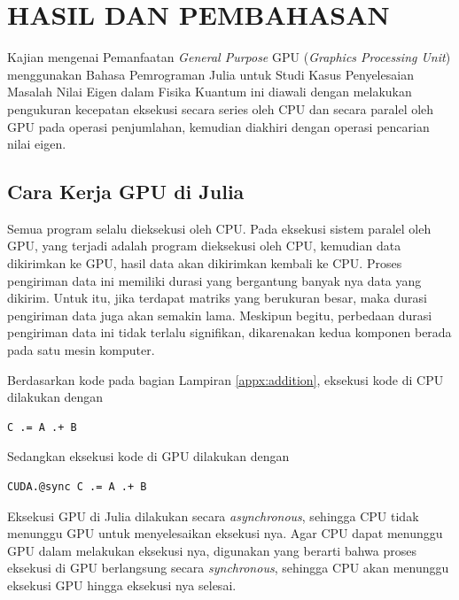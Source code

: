 \chapter{HASIL DAN PEMBAHASAN}

Kajian mengenai Pemanfaatan \emph{General Purpose} GPU (\emph{Graphics Processing Unit}) menggunakan Bahasa Pemrograman Julia untuk Studi Kasus Penyelesaian Masalah Nilai Eigen dalam Fisika Kuantum ini diawali dengan melakukan pengukuran kecepatan eksekusi secara series oleh CPU dan secara paralel oleh GPU pada operasi penjumlahan, kemudian diakhiri dengan operasi pencarian nilai eigen.


\section{Cara Kerja GPU di Julia}

Semua program selalu dieksekusi oleh CPU. Pada eksekusi sistem paralel oleh GPU, yang terjadi adalah program dieksekusi oleh CPU, kemudian data dikirimkan ke GPU, hasil data akan dikirimkan kembali ke CPU. Proses pengiriman data ini memiliki durasi yang bergantung banyak nya data yang dikirim. Untuk itu, jika terdapat matriks yang berukuran besar, maka durasi pengiriman data juga akan semakin lama. Meskipun begitu, perbedaan durasi pengiriman data ini tidak terlalu signifikan, dikarenakan kedua komponen berada pada satu mesin komputer.

Berdasarkan kode pada bagian Lampiran \ref{appx:addition}, eksekusi kode di CPU dilakukan dengan

\begin{lstlisting}
C .= A .+ B
\end{lstlisting}

\noindent
Sedangkan eksekusi kode di GPU dilakukan dengan

\begin{lstlisting}
CUDA.@sync C .= A .+ B
\end{lstlisting}

\noindent
Eksekusi GPU di Julia dilakukan secara \emph{asynchronous}, sehingga CPU tidak menunggu GPU untuk menyelesaikan eksekusi nya. Agar CPU dapat menunggu GPU dalam melakukan eksekusi nya, digunakan  yang berarti bahwa proses eksekusi di GPU berlangsung secara \emph{synchronous}, sehingga CPU akan menunggu eksekusi GPU hingga eksekusi nya selesai.

